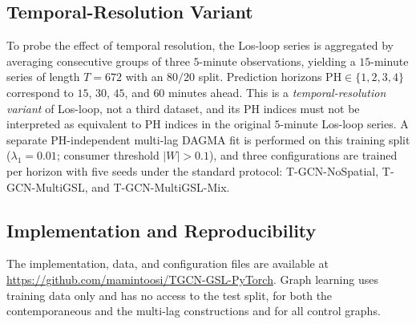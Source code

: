 \subsection{Temporal-Resolution Variant}\label{sec:variant15}

To probe the effect of temporal resolution, the Los-loop series is aggregated
by averaging consecutive groups of three $5$-minute observations, yielding a
$15$-minute series of length $T=672$ with an $80/20$ split. Prediction
horizons $\mathrm{PH}\in\{1,2,3,4\}$ correspond to $15$, $30$, $45$, and
$60$ minutes ahead. This is a \emph{temporal-resolution variant} of
Los-loop, not a third dataset, and its PH indices must not be interpreted as
equivalent to PH indices in the original $5$-minute Los-loop series. A
separate PH-independent multi-lag DAGMA fit is performed on this training
split ($\lambda_1=0.01$; consumer threshold $|W|>0.1$), and three
configurations are trained per horizon with five seeds under the standard
protocol: T-GCN-NoSpatial, T-GCN-MultiGSL, and T-GCN-MultiGSL-Mix.

\subsection{Implementation and Reproducibility}\label{sec:repro}

The implementation, data, and configuration files are available at
\url{https://github.com/mamintoosi/TGCN-GSL-PyTorch}. Graph learning uses
training data only and has no access to the test split, for both the
contemporaneous and the multi-lag constructions and for all control graphs.
